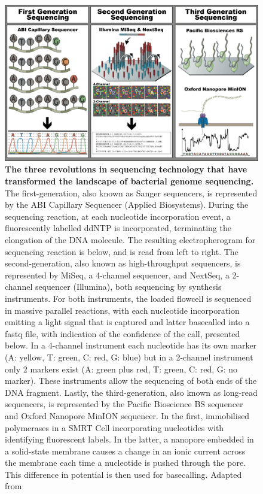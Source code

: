 \begin{figure}[h!]
\centering
\includegraphics[width=\textwidth]{figures/introduction/Figure 5.png}
\caption{\textbf{The three revolutions in sequencing technology that have transformed the landscape of bacterial genome sequencing.} The first-generation, also known as Sanger sequencers, is represented by the ABI Capillary Sequencer (Applied Biosystems). During the sequencing reaction, at each nucleotide incorporation event, a fluorescently labelled \ac{ddNTP} is incorporated, terminating the elongation of the DNA molecule. The resulting electropherogram for sequencing reaction is below, and is read from left to right. The second-generation, also known as high-throughput sequencers, is represented by MiSeq, a 4-channel sequencer, and NextSeq, a 2-channel sequencer (Illumina), both sequencing by synthesis instruments. For both instruments, the loaded flowcell is sequenced in massive parallel reactions, with each nucleotide incorporation emitting a light signal that is captured and latter basecalled into a fastq file, with indication of the confidence of the call, presented below. In a 4-channel instrument each nucleotide has its own marker (A: yellow, T: green, C: red, G: blue) but in a 2-channel instrument only 2 markers exist (A: green plus red, T: green, C: red, G: no marker). These instruments allow the sequencing of both ends of the DNA fragment. Lastly, the third-generation, also known as long-read sequencers, is represented by the Pacific Bioscience BS sequencer and Oxford Nanopore MinION sequencer. In the first, immobilised polymerases in a \ac{SMRT} Cell incorporating nucleotides with identifying fluorescent labels. In the latter, a nanopore embedded in a solid-state membrane causes a change in an ionic current across the membrane each time a nucleotide is pushed through the pore. This difference in potential is then used for basecalling. Adapted from \cite{hagemann_overview_2015, loman_twenty_2015,goodwin_coming_2016, wang_nanopore_2021, metzker_sequencing_2010, xu_recent_2020}}
\label{fig:figure5}
\end{figure}

